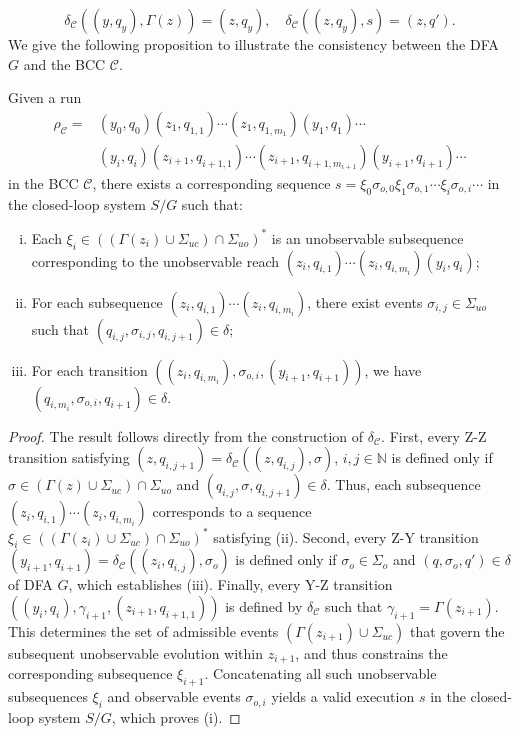 \documentclass[journal,twoside,web]{ieeecolor}
\begin{document}
$$
\delta_{\mathcal{C}}((y,q_y),\Gamma(z))=(z,q_y),
\quad
\delta_{\mathcal{C}}((z,q_y), s)=(z, q').
$$
%
We give the following proposition to illustrate the consistency between the DFA $G$ and the BCC $\mathcal{C}$.
%
\begin{proposition}\label{prop:bcc_dfa_consistency}
Given a run 
$$
\begin{aligned}
\rho_{\mathcal{C}} = &(y_0, q_0) (z_1, q_{1,1}) \cdots (z_1, q_{1,m_1}) (y_1, q_1) \cdots \\
                     &(y_i, q_i) (z_{i+1}, q_{i+1,1}) \cdots (z_{i+1}, q_{i+1,m_{i+1}}) (y_{i+1}, q_{i+1}) \cdots
\end{aligned}
$$
in the BCC $\mathcal{C}$, there exists a corresponding sequence
$
s = \xi_0 \sigma_{o,0} \xi_1 \sigma_{o,1} \cdots \xi_i \sigma_{o,i} \cdots
$
in the closed-loop system $S/G$ such that:
\begin{enumerate}[(i)]
    \item Each $\xi_i \in ((\Gamma(z_i) \cup \Sigma_{uc}) \cap \Sigma_{uo})^*$ is an unobservable subsequence corresponding to the unobservable reach $(z_{i}, q_{i,1}) \cdots (z_{i}, q_{i,m_{i}}) (y_{i}, q_{i})$;
    \item For each subsequence $(z_i, q_{i,1}) \cdots (z_i, q_{i,m_i})$, there exist events $\sigma_{i,j} \in \Sigma_{uo}$ such that
    $
    (q_{i,j}, \sigma_{i,j}, q_{i,j+1}) \in \delta;
    $
    \item For each transition $((z_i, q_{i,m_i}), \sigma_{o,i}, (y_{i+1}, q_{i+1}))$, we have
    $
    (q_{i,m_i}, \sigma_{o,i}, q_{i+1}) \in \delta.
    $
\end{enumerate}
\end{proposition}
%
\begin{proof}
The result follows directly from the construction of $\delta_{\mathcal{C}}$.
%
First, every Z-Z transition satisfying $(z, q_{i,j+1}) = \delta_{\mathcal{C}}((z, q_{i,j}), \sigma)$, $i,j \in \mathbb{N}$ is defined only if $\sigma \in (\Gamma(z) \cup \Sigma_{uc}) \cap \Sigma_{uo}$ and $(q_{i,j}, \sigma, q_{i,j+1}) \in \delta$. 
Thus, each subsequence $(z_i, q_{i,1}) \cdots (z_i, q_{i,m_i})$ corresponds to a sequence $\xi_i \in ((\Gamma(z_i) \cup \Sigma_{uc}) \cap \Sigma_{uo})^*$ satisfying (ii).
%
Second, every Z-Y transition $(y_{i+1}, q_{i+1}) = \delta_{\mathcal{C}}((z_{i}, q_{i,j}), \sigma_o)$ is defined only if $\sigma_o \in \Sigma_o$ and $(q, \sigma_o, q') \in \delta$ of DFA $G$, which establishes (iii).
%
Finally, every Y-Z transition $((y_i, q_i), \gamma_{i+1}, (z_{i+1}, q_{i+1,1}))$ is defined by $\delta_\mathcal{C}$ such that $\gamma_{i+1} = \Gamma(z_{i+1})$.
This determines the set of admissible events $(\Gamma(z_{i+1}) \cup \Sigma_{uc})$ that govern the subsequent unobservable evolution within $z_{i+1}$, and thus constrains the corresponding subsequence $\xi_{i+1}$.
Concatenating all such unobservable subsequences $\xi_i$ and observable events $\sigma_{o,i}$ yields a valid execution $s$ in the closed-loop system $S / G$, which proves (i).
\end{proof}
\end{document}
